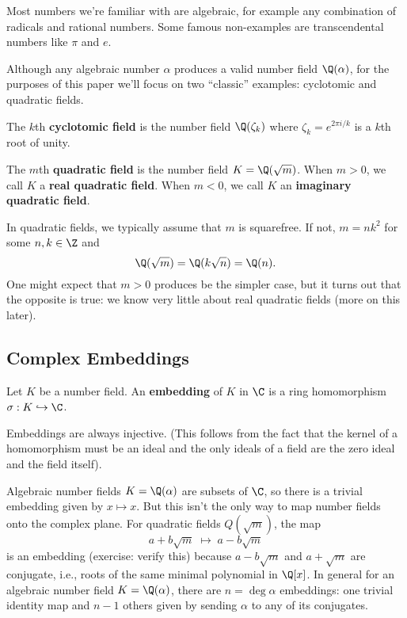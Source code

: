 Most numbers we're familiar with are algebraic, for example any combination of radicals and rational numbers. Some famous non-examples are transcendental numbers like $\pi$ and $e$.

Although any algebraic number $\alpha$ produces a valid number field $\Q(\alpha)$, for the purposes of this paper we'll focus on two ``classic'' examples: cyclotomic and quadratic fields.

\begin{definition}
    The $k$th \textbf{cyclotomic field} is the number field $\Q(\zeta_k)$ where $\zeta_k = e^{2 \pi i / k}$ is a $k$th root of unity.
\end{definition}

\begin{definition}
    The $m$th \textbf{quadratic field} is the number field $K = \Q(\sqrt{m})$. When $m > 0$, we call $K$ a \textbf{real quadratic field}. When $m < 0$, we call $K$ an \textbf{imaginary quadratic field}.
\end{definition}

In quadratic fields, we typically assume that $m$ is squarefree. If not, $m = nk^2$ for some $n, k \in \Z$ and
\begin{equation}
    \Q(\sqrt m) = \Q(k \sqrt n) = \Q(n).
\end{equation}
One might expect that $m > 0$ produces be the simpler case, but it turns out that the opposite is true: we know very little about real quadratic fields (more on this later).


\subsection{Complex Embeddings}


\begin{definition}[Embedding]
    Let $K$ be a number field. An \textbf{embedding} of $K$ in $\C$ is a ring homomorphism $\sigma : K \hookrightarrow \C$.

    Embeddings are always injective. (This follows from the fact that the kernel of a homomorphism must be an ideal and the only ideals of a field are the zero ideal and the field itself).
\end{definition}

Algebraic number fields $K = \Q(\alpha)$ are subsets of $\C$, so there is a trivial embedding given by $x \mapsto x$. But this isn't the only way to map number fields onto the complex plane. For quadratic fields $Q(\sqrt{m})$, the map
\begin{equation}
    a + b \sqrt{m} \; \mapsto \; a - b \sqrt{m}
\end{equation}
is an embedding (exercise: verify this) because $a - b \sqrt{m}$ and $a + \sqrt{m}$ are conjugate, i.e., roots of the same minimal polynomial in $\Q[x]$. In general for an algebraic number field $K = \Q(\alpha)$, there are $n = \deg \alpha$ embeddings: one trivial identity map and $n-1$ others given by sending $\alpha$ to any of its conjugates.

